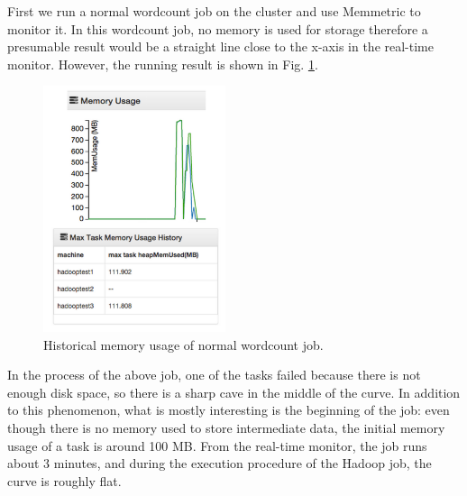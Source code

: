 First we run a normal wordcount job on the cluster and use Memmetric to monitor it. In this wordcount job, no memory is used for storage therefore a presumable result would be a straight line close to the x-axis in the real-time monitor. However, the running result is shown in Fig. \ref{ref:baseline.png}.
\begin{figure}[ht]
  \centering
    \includegraphics[width=2.1in]{image/baselinemodified.png}
    \caption{Historical memory usage of normal wordcount job.}
    \label{ref:baseline.png}
\end{figure}
\par
In the process of the above job, one of the tasks failed because there is not enough disk space, so there is a sharp cave in the middle of the curve.
In addition to this phenomenon, what is mostly interesting is the beginning of the job: even though there is no memory used to store intermediate data, the initial memory usage of a task is around 100 MB.
From the real-time monitor, the job runs about 3 minutes, and during the execution procedure of the Hadoop job, the curve is roughly flat.